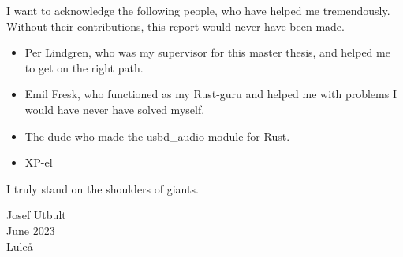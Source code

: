 I want to acknowledge the following people, who have helped me tremendously. 
Without their contributions, this report would never have been made.

\begin{itemize}
	\item Per Lindgren, who was my supervisor for this master thesis, and helped me to get on the right path.
	\item Emil Fresk, who functioned as my Rust-guru and helped me with problems I would have never have solved myself.
	\item The dude who made the usbd\_audio module for Rust. 
	\item XP-el
\end{itemize}

I truly stand on the shoulders of giants.

Josef Utbult \\
June 2023 \\
Luleå
